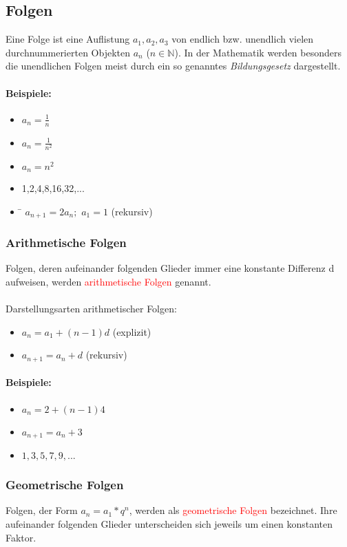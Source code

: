 \subsection{Folgen}
Eine Folge ist eine Auflistung $a_1,a_2,a_3$ von endlich bzw. unendlich vielen durchnummerierten Objekten $a_n$ ($n\in{\mathbb{N}}$).
In der Mathematik werden besonders die unendlichen Folgen meist durch ein so genanntes \textit{Bildungsgesetz} dargestellt.

\paragraph{Beispiele:}
\begin{itemize}
\item $a_n = \frac{1}{n}$
\item $a_n = \frac{1}{n^{2}}$
\item $a_n = n^{2}$
\item 1,2,4,8,16,32,...
\item \begin{tabbing} 
\hspace{3.5 cm}\=\hspace{5 cm}\kill 
$a_{n+1} = 2a_n;$ \>$a_1 = 1$ (rekursiv)
\end{tabbing}
\end{itemize}

\subsubsection{Arithmetische Folgen}
Folgen, deren aufeinander folgenden Glieder immer eine konstante Differenz d aufweisen, werden \textcolor{red}{arithmetische Folgen} genannt.\\\\
Darstellungsarten arithmetischer Folgen:
\begin{itemize}
\item $a_n = a_1 + (n-1)d$ (explizit)
\item $a_{n+1} = a_n + d$ (rekursiv)
\end{itemize}
\paragraph{Beispiele:}\hspace{12 cm}
\begin{itemize}
\item $a_n = 2 + (n-1)4$
\item $a_{n+1} = a_n + 3$
\item $1,3,5,7,9,...$
\end{itemize}

\subsubsection{Geometrische Folgen}
Folgen, der Form $a_n = a_1 * q^{n}$, werden als \textcolor{red}{geometrische Folgen} bezeichnet.
Ihre aufeinander folgenden Glieder unterscheiden sich jeweils um einen konstanten Faktor.